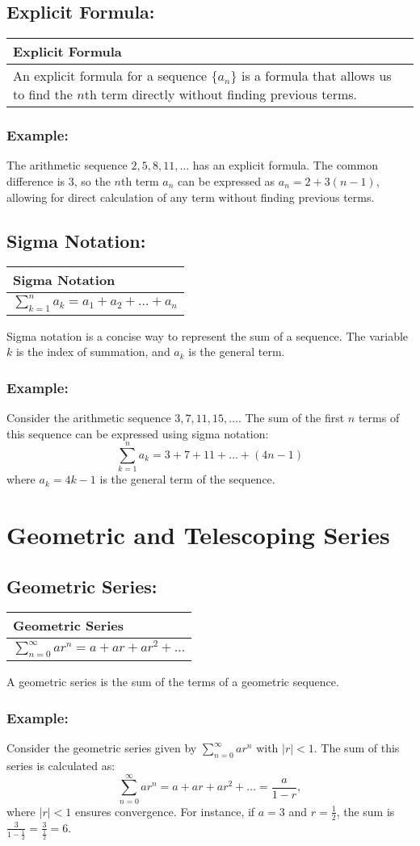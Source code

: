 \documentclass[12pt]{article}
\newcommand{\formula}[2]{
    {\renewcommand{\arraystretch}{2}
        \begin{center}
        \begin{tabular}{|p{0.9\textwidth}|}
        \hline
        \textbf{#1} \\
        \hline
        #2 \\
        \hline
        \end{tabular}
        \end{center}
    }
}
\begin{document}
\vspace{\baselineskip}

\subsection{Explicit Formula: }
\formula{Explicit Formula}{
    An explicit formula for a sequence $\{a_n\}$ is a formula that allows us to find the $n$th term directly without finding previous terms.
}
\subsubsection{Example: }
The arithmetic sequence $2, 5, 8, 11, \ldots$ has an explicit formula. The common difference is $3$, so the $n$th term $a_n$ can be expressed as $a_n = 2 + 3(n-1)$, allowing for direct calculation of any term without finding previous terms.


\subsection{Sigma Notation: }
\formula{Sigma Notation}{
    $\sum_{k=1}^{n} a_k = a_1 + a_2 + \ldots + a_n$
}
Sigma notation is a concise way to represent the sum of a sequence. The variable $k$ is the index of summation, and $a_k$ is the general term.
\subsubsection{Example: }
Consider the arithmetic sequence $3, 7, 11, 15, \ldots$. The sum of the first $n$ terms of this sequence can be expressed using sigma notation:
\[
\sum_{k=1}^{n} a_k = 3 + 7 + 11 + \ldots + (4n-1)
\]
where $a_k = 4k - 1$ is the general term of the sequence.

\vspace{\baselineskip}
\vspace{\baselineskip}

\section{Geometric and Telescoping Series}

\subsection{Geometric Series: }
\formula{Geometric Series}{
    $\sum_{n=0}^{\infty} ar^n = a + ar + ar^2 + \ldots$
}
A geometric series is the sum of the terms of a geometric sequence.
\subsubsection{Example: }
Consider the geometric series given by $\sum_{n=0}^{\infty} ar^n$ with $|r| < 1$. The sum of this series is calculated as:
\[
\sum_{n=0}^{\infty} ar^n = a + ar + ar^2 + \ldots = \frac{a}{1 - r},
\]
where $|r| < 1$ ensures convergence. For instance, if $a = 3$ and $r = \frac{1}{2}$, the sum is $\frac{3}{1 - \frac{1}{2}} = \frac{3}{\frac{1}{2}} = 6$.
\end{document}
